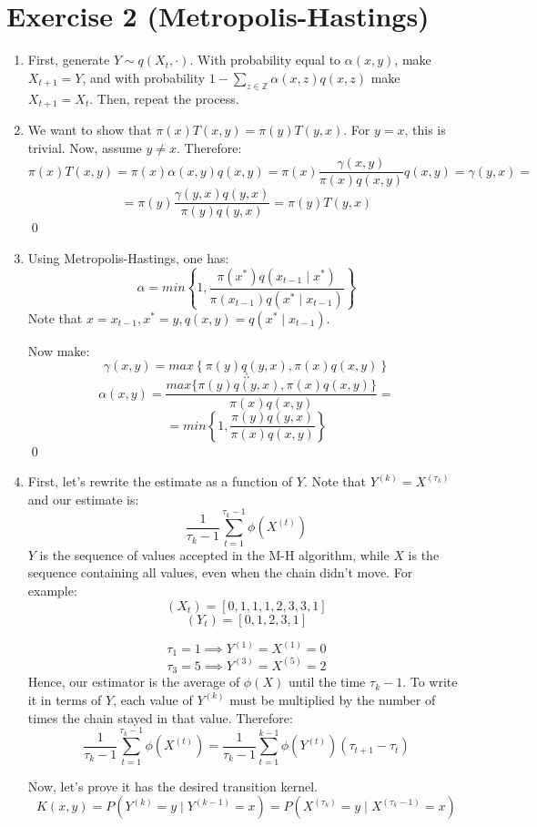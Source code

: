 \documentclass[12pt,letterpaper]{article}
\begin{document}
\section*{Exercise 2 (Metropolis-Hastings)}
\begin{enumerate}[leftmargin=!,labelindent=5pt]
\item First, generate $Y \sim q(X_t, \cdot)$. 
With probability equal to $\alpha(x,y)$, make $X_{t+1} = Y$, and with
probability $1 - \sum_{z \in \mathbb Z} \alpha(x,z)q(x,z)$ make
$X_{t+1} = X_t$. Then, repeat the process.

\item We want to show that $\pi(x)T(x,y) = \pi(y)T(y,x)$.
For $y=x$, this is trivial. Now, assume $y\neq x$. Therefore:
$$
\pi(x)T(x,y) = \pi(x)\alpha(x,y)q(x,y) =
\pi(x)\frac{\gamma(x,y)}{\pi(x)q(x,y)}q(x,y) = \gamma(y,x) =
$$
$$
= 
\pi(y)\frac{\gamma(y,x)q(y,x)}{\pi(y)q(y,x)} = \pi(y)T(y,x)
$$
\qed


\item Using Metropolis-Hastings, one has:
$$ \alpha = min \left\{ 
1, \frac{\pi(x^*)q(x_{t-1} \mid x^*)}{\pi(x_{t-1})q(x^*\mid x_{t-1})}
\right\}$$
Note that 
$x = x_{t-1}, x^* = y, q(x,y) = q(x^* \mid x_{t-1})$.

Now make:
$$ \gamma(x,y) = max \left\{ 
\pi(y)q(y,x),\pi(x)q(x,y)
\right\}$$
$$ \therefore $$
$$\alpha(x,y) =
\frac{max\{ \pi(y)q(y,x), \pi(x)q(x,y)\}}{\pi(x)q(x,y)} = 
$$
$$ = min \left\{ 
1, \frac{\pi(y)q(y,x)}{\pi(x)q(x,y)}
\right\}$$
\qed

\item First, let's rewrite the estimate as a function of $Y$.
Note that $Y^{(k)} = X^{(\tau_k)}$ and our estimate is:
$$
\frac{1}{\tau_k - 1} \sum_{t=1}^{\tau_k-1} \phi(X^{(t)})
$$
$Y$ is the sequence of values accepted in the M-H algorithm, while
$X$ is the sequence containing all values, even when the chain
didn't move. For example:
$$
(X_t) = [0,1,1,1,2,3,3,1]
$$
$$
(Y_t) = [0,1,2,3,1]
$$

$$
\tau_1 = 1 \implies Y^{(1)} = X^{(1)} = 0
$$
$$
\tau_3 = 5 \implies Y^{(3)} = X^{(5)} = 2
$$
Hence, our estimator is the average of
$\phi(X)$ until the time $\tau_k - 1$. To write it in terms of $Y$,
each value of $Y^{(k)}$ must be multiplied by the number of times
the chain stayed in that value. Therefore:
$$
\frac{1}{\tau_k - 1} \sum_{t=1}^{\tau_k-1} \phi(X^{(t)}) =
\frac{1}{\tau_k - 1} \sum_{t=1}^{k-1} \phi(Y^{(t)})
(\tau_{t+1} - \tau_{t})
$$


Now, let's prove it has the desired transition kernel.
$$
K(x,y) = P(Y^{(k)}= y \mid Y^{(k-1)}=x) =
P(X^{(\tau_k)}=y \mid X^{(\tau_k -1)}=x)
$$


\end{enumerate}
\end{document}
